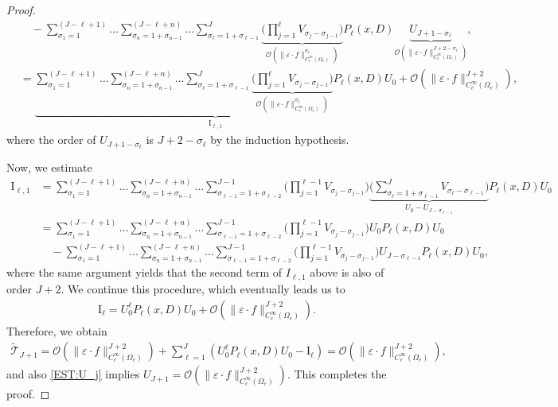 \documentclass[10pt,a4paper]{amsart}
\begin{document}
\begin{proof}
\begin{align*}
&\quad - \sum_{\sigma_1 = 1}^{(J-\ell+1)}\ldots \sum_{\sigma_n = 1 + \sigma_{n-1}}^{(J-\ell+n)}\ldots \sum_{\sigma_\ell = 1 + \sigma_{\ell-1}}^{J}  \underbrace{\bigg( \prod_{j=1}^\ell V_{\sigma_j-\sigma_{j-1}} \bigg)}_{ \mathcal{O}(\|\varepsilon\cdot f\|^{\sigma_\ell}_{C_c^\infty(\Omega_e)})}    P_\ell(x,D) \underbrace{U_{J+1-\sigma_\ell}}_{\mathcal{O}(\|\varepsilon\cdot f\|^{J+2-\sigma_\ell}_{C_c^\infty(\Omega_e)})},\\
&= \underbrace{\sum_{\sigma_1 = 1}^{(J-\ell+1)} \ldots \sum_{\sigma_n = 1 + \sigma_{n-1}}^{(J-\ell+n)} \ldots \sum_{\sigma_\ell = 1 + \sigma_{\ell-1}}^{J}  \underbrace{\bigg( \prod_{j=1}^\ell V_{\sigma_j-\sigma_{j-1}} \bigg)}_{ \mathcal{O}(\|\varepsilon\cdot f\|^{\sigma_\ell}_{C_c^\infty(\Omega_e)})}    P_\ell(x,D) U_0 }_{\mathrm{I}_{\ell,1}} +\mathcal{O} (\|\varepsilon\cdot f\|^{J+2}_{C_c^\infty(\Omega_e)}),
\end{align*}	
where the order of $U_{J+1-\sigma_\ell}$ is $J+2-\sigma_\ell$ by the induction hypothesis.


Now, we estimate 
\begin{align*}
\mathrm{I}_{\ell,1} 
&=  \sum_{\sigma_1 = 1}^{(J-\ell+1)}\ldots \sum_{\sigma_n = 1 + \sigma_{n-1}}^{(J-\ell+n)}\ldots \sum_{\sigma_{\ell-1} = 1 + \sigma_{\ell-2}}^{J-1}  \bigg( \prod_{j=1}^{\ell-1} V_{\sigma_j-\sigma_{j-1}} \bigg) \underbrace{\bigg(\sum_{\sigma_\ell= 1 +  \sigma_{\ell-1}}^{J} V_{\sigma_\ell-\sigma_{\ell-1}} \bigg)}_{U_0-U_{J-\sigma_{\ell-1}}}  P_\ell(x,D) U_{0}  \\
&=  \sum_{\sigma_1 = 1}^{(J-\ell+1)}\ldots \sum_{\sigma_n = 1 + \sigma_{n-1}}^{(J-\ell+n)}\ldots \sum_{\sigma_{\ell-1} = 1 + \sigma_{\ell-2}}^{J-1}  \bigg( \prod_{j=1}^{\ell-1} V_{\sigma_j-\sigma_{j-1}} \bigg)  U_0  P_\ell(x,D) U_{0} \\
&\quad - \sum_{\sigma_1 = 1}^{(J-\ell+1)}\ldots \sum_{\sigma_n = 1 + \sigma_{n-1}}^{(J-\ell+n)}\ldots \sum_{\sigma_{\ell-1} = 1 + \sigma_{\ell-2}}^{J-1}  \bigg( \prod_{j=1}^{\ell-1} V_{\sigma_j-\sigma_{j-1}} \bigg)   U_{J-\sigma_{\ell-1}}   P_\ell(x,D) U_{0},
\end{align*}	
where the same argument yields that the second term of $I_{\ell,1}$ above is also of order $J+2$.
We continue this procedure, which eventually leads us to 
\begin{align*}
\mathrm{I}_{\ell} = U_0^\ell P_{\ell}(x,D) U_0 + \mathcal{O}(\|\varepsilon\cdot f\|^{J+2}_{C_c^\infty(\Omega_e)}).
\end{align*}
Therefore, we obtain 
\begin{align*}
\widetilde{\mathcal{T}}_{J+1} = \mathcal{O}(\|\varepsilon\cdot f\|^{J+2}_{C_c^\infty(\Omega_e)})+\sum^{J}_{\ell=1} \left(U_0^ {\ell}P_\ell(x,D)U_0 - \mathrm{I}_{\ell}\right) =  \mathcal{O}(\|\varepsilon\cdot f\|^{J+2}_{C_c^\infty(\Omega_e)}),
\end{align*}
and also \eqref{EST:U_j} implies 
$U_{J+1}=  \mathcal{O}(\|\varepsilon\cdot f\|^{J+2}_{C_c^\infty(\Omega_e)})$. This completes the proof.

\end{proof}
\end{document}
